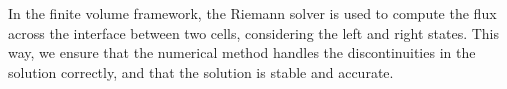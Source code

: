 In the finite volume framework, the Riemann solver is used to compute the flux across the interface between two cells, considering the left and right states.
This way, we ensure that the numerical method handles the discontinuities in the solution correctly, and that the solution is stable and accurate.





